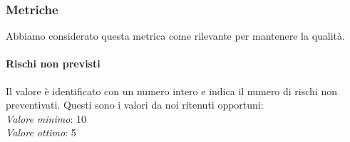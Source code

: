 \subsubsection{Metriche}
Abbiamo considerato questa metrica come rilevante per mantenere la qualità.
\paragraph{Rischi non previsti}
Il valore è identificato con un numero intero e indica il numero di rischi non preventivati.
Questi sono i valori da noi ritenuti opportuni:\\
\textit{Valore minimo}: 10\\
\textit{Valore ottimo}: 5\\
